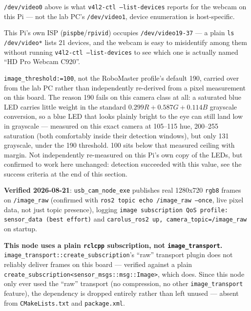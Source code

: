 \documentclass[11pt]{report}
\newenvironment{warningbox}%
  {\begin{lrbox}{\warnbox}\begin{minipage}{0.90\textwidth}}%
  {\end{minipage}\end{lrbox}%
   \begin{center}\fcolorbox{black}{codebg}{\usebox{\warnbox}}\end{center}}
\begin{document}
\texttt{/dev/video0} above is what \texttt{v4l2-ctl --list-devices} reports
for the webcam on this Pi --- not the lab PC's \texttt{/dev/video1}, device
enumeration is host-specific.

\begin{warningbox}
This Pi's own ISP (\texttt{pispbe}/\texttt{rpivid}) occupies
\texttt{/dev/video19-37} --- a plain \texttt{ls /dev/video*} lists 21
devices, and the webcam is easy to misidentify among them without running
\texttt{v4l2-ctl --list-devices} to see which one is actually named
``HD Pro Webcam C920''.
\end{warningbox}

\texttt{image\_threshold:=100}, not the RoboMaster profile's default 190,
carried over from the lab PC rather than independently re-derived from a
pixel measurement on this board. The reason 190 fails on this camera class
at all: a saturated blue LED carries little weight in the standard
$0.299R+0.587G+0.114B$ grayscale conversion, so a blue LED that looks
plainly bright to the eye can still land low in grayscale --- measured on
this exact camera at 105--115 hue, 200--255 saturation (both comfortably
inside their detection windows), but only 131 grayscale, under the 190
threshold. 100 sits below that measured ceiling with margin. Not
independently re-measured on this Pi's own copy of the LEDs, but confirmed
to work here unchanged: detection succeeded with this value, see the
success criteria at the end of this section.

\textbf{Verified 2026-08-21}: \texttt{usb\_cam\_node\_exe} publishes real
1280x720 \texttt{rgb8} frames on \texttt{/image\_raw} (confirmed with
\texttt{ros2 topic echo /image\_raw --once}, live pixel data, not just topic
presence), logging \texttt{image subscription QoS profile: sensor\_data (best
effort)} and \texttt{carolus\_ros2 up, camera\_topic=/image\_raw} on startup.

\begin{warningbox}
\textbf{This node uses a plain \texttt{rclcpp} subscription, not
\texttt{image\_transport}.}
\texttt{image\_transport::\allowbreak create\_subscription}'s
``raw'' transport plugin does not reliably deliver frames on this board ---
verified against a plain
\texttt{create\_subscription<\allowbreak sensor\_msgs::\allowbreak msg::\allowbreak Image>},
which does. Since this node only ever used the ``raw'' transport (no
compression, no other \texttt{image\_transport} feature), the dependency is
dropped entirely rather than left unused --- absent from
\texttt{CMakeLists.txt} and \texttt{package.xml}.
\end{warningbox}
\end{document}
